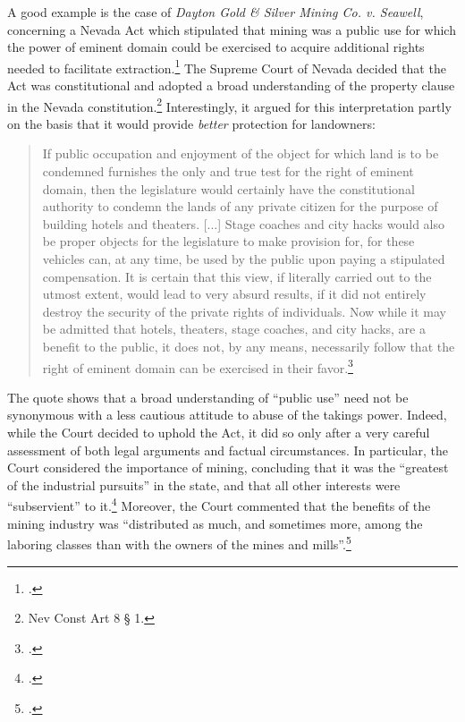 A good example is the case of {\it Dayton Gold \& Silver Mining Co. v. Seawell}, concerning a Nevada Act which stipulated that mining was a public use for which the power of eminent domain could be exercised to acquire additional rights needed to facilitate extraction.\footcite{seawell76} The Supreme Court of Nevada decided that the Act was constitutional and adopted a broad understanding of the property clause in the Nevada constitution.\footnote{Nev Const Art 8 § 1.} Interestingly, it argued for this interpretation partly on the basis that it would provide {\it better} protection for landowners:

\begin{quote}
If public occupation and enjoyment of the object for which land is to be condemned furnishes the only and true test for the right of eminent domain, then the legislature would certainly have the constitutional authority to condemn the lands of any private citizen for the purpose of building hotels and theaters. [...] Stage coaches and city hacks would also be proper objects for the legislature to make provision for, for these vehicles can, at any time, be used by the public upon paying a stipulated compensation. It is certain that this view, if literally carried out to the utmost extent, would lead to very absurd results, if it did not entirely destroy the security of the private rights of individuals. Now while it may be admitted that hotels, theaters, stage coaches, and city hacks, are a benefit to the public, it does not, by any means, necessarily follow that the right of eminent domain can be exercised in their favor.\footcite[410-411]{seawell76}
\end{quote}

The quote shows that a broad understanding of ``public use'' need not be synonymous with a less cautious attitude to abuse of the takings power. Indeed, while the Court decided to uphold the Act, it did so only after a very careful assessment of both legal arguments and factual circumstances. In particular, the Court considered the importance of mining, concluding that it was the ``greatest of the industrial pursuits'' in the state, and that all other interests were ``subservient'' to it.\footcite[409]{seawell76} Moreover, the Court commented that the benefits of the mining industry was ``distributed as much, and sometimes more, among the laboring classes than with the owners of the mines and mills''.\footcite[409]{seawell76}


